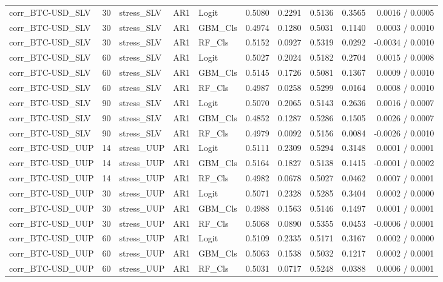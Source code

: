 \begin{table}[H]
\begin{tabular}{lllllrrrrr}
corr_BTC-USD_SLV & 30 & stress_SLV & AR1 & Logit & 0.5080 & 0.2291 & 0.5136 & 0.3565 & 0.0016 / 0.0005 \\
corr_BTC-USD_SLV & 30 & stress_SLV & AR1 & GBM_Cls & 0.4974 & 0.1280 & 0.5031 & 0.1140 & 0.0003 / 0.0010 \\
corr_BTC-USD_SLV & 30 & stress_SLV & AR1 & RF_Cls & 0.5152 & 0.0927 & 0.5319 & 0.0292 & -0.0034 / 0.0010 \\
corr_BTC-USD_SLV & 60 & stress_SLV & AR1 & Logit & 0.5027 & 0.2024 & 0.5182 & 0.2704 & 0.0015 / 0.0008 \\
corr_BTC-USD_SLV & 60 & stress_SLV & AR1 & GBM_Cls & 0.5145 & 0.1726 & 0.5081 & 0.1367 & 0.0009 / 0.0010 \\
corr_BTC-USD_SLV & 60 & stress_SLV & AR1 & RF_Cls & 0.4987 & 0.0258 & 0.5299 & 0.0164 & 0.0008 / 0.0010 \\
corr_BTC-USD_SLV & 90 & stress_SLV & AR1 & Logit & 0.5070 & 0.2065 & 0.5143 & 0.2636 & 0.0016 / 0.0007 \\
corr_BTC-USD_SLV & 90 & stress_SLV & AR1 & GBM_Cls & 0.4852 & 0.1287 & 0.5286 & 0.1505 & 0.0026 / 0.0007 \\
corr_BTC-USD_SLV & 90 & stress_SLV & AR1 & RF_Cls & 0.4979 & 0.0092 & 0.5156 & 0.0084 & -0.0026 / 0.0010 \\
corr_BTC-USD_UUP & 14 & stress_UUP & AR1 & Logit & 0.5111 & 0.2309 & 0.5294 & 0.3148 & 0.0001 / 0.0001 \\
corr_BTC-USD_UUP & 14 & stress_UUP & AR1 & GBM_Cls & 0.5164 & 0.1827 & 0.5138 & 0.1415 & -0.0001 / 0.0002 \\
corr_BTC-USD_UUP & 14 & stress_UUP & AR1 & RF_Cls & 0.4982 & 0.0678 & 0.5027 & 0.0462 & 0.0007 / 0.0001 \\
corr_BTC-USD_UUP & 30 & stress_UUP & AR1 & Logit & 0.5071 & 0.2328 & 0.5285 & 0.3404 & 0.0002 / 0.0000 \\
corr_BTC-USD_UUP & 30 & stress_UUP & AR1 & GBM_Cls & 0.4988 & 0.1563 & 0.5146 & 0.1497 & 0.0001 / 0.0001 \\
corr_BTC-USD_UUP & 30 & stress_UUP & AR1 & RF_Cls & 0.5068 & 0.0890 & 0.5355 & 0.0453 & -0.0006 / 0.0001 \\
corr_BTC-USD_UUP & 60 & stress_UUP & AR1 & Logit & 0.5109 & 0.2335 & 0.5171 & 0.3167 & 0.0002 / 0.0000 \\
corr_BTC-USD_UUP & 60 & stress_UUP & AR1 & GBM_Cls & 0.5063 & 0.1538 & 0.5032 & 0.1217 & 0.0002 / 0.0001 \\
corr_BTC-USD_UUP & 60 & stress_UUP & AR1 & RF_Cls & 0.5031 & 0.0717 & 0.5248 & 0.0388 & 0.0006 / 0.0001 \\

\end{tabular}
\end{table}
